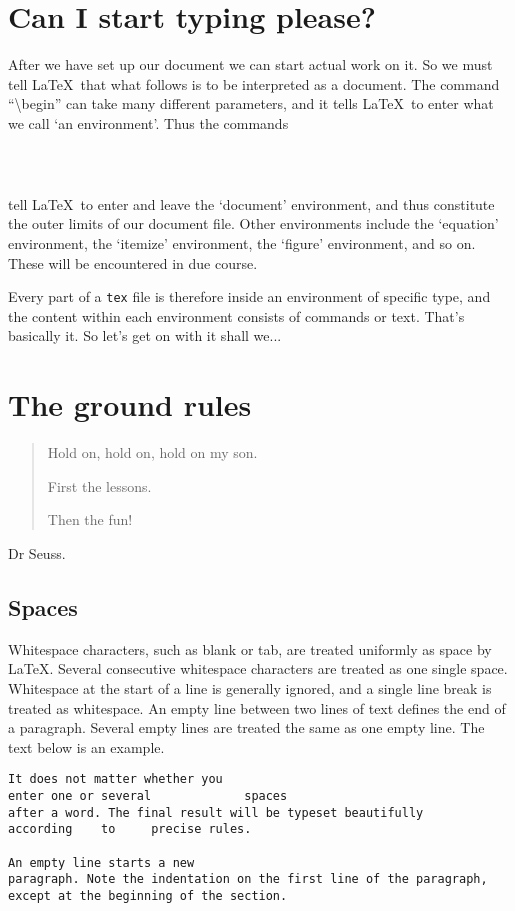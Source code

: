 \pagebreak
\section{Can I start typing please?}

After we have set up our document we can start actual work on it. So we must tell \LaTeX\ that what follows is to be interpreted as a document. The command ``{\textbackslash}begin'' can take many different parameters, and it tells \LaTeX\ to enter what we call `an environment'. Thus the commands
\begin{verbatim}



\end{verbatim}
tell \LaTeX\ to enter and leave the `document' environment, and thus constitute the outer limits of our document file. Other environments include the `equation' environment, the `itemize' environment, the `figure' environment, and so on. These will be encountered in due course.

Every part of a {\tt tex} file is therefore inside an environment of specific type, and the content within each environment consists of commands or text. That's basically it. So let's get on with it shall we...

\pagebreak
\section{The ground rules}
\begin{quote}
Hold on, hold on, hold on my son.

First the lessons.

Then the fun!
\end{quote}
Dr Seuss.

\subsection{Spaces}
Whitespace characters, such as blank or tab, are treated uniformly as space by \LaTeX. Several consecutive whitespace characters are treated as one single space. Whitespace at the start of a line is generally ignored, and a single line break is treated as whitespace. An empty line between two lines of text defines the end of a paragraph. Several empty lines are treated the same as one empty line. The text below is an example.

\begin{verbatim}
It does not matter whether you
enter one or several             spaces
after a word. The final result will be typeset beautifully
according    to     precise rules.

An empty line starts a new
paragraph. Note the indentation on the first line of the paragraph,
except at the beginning of the section.
\end{verbatim}


